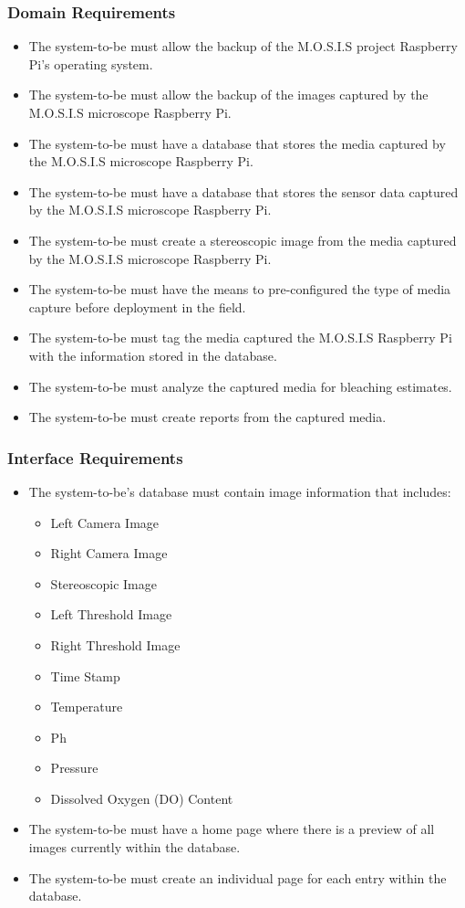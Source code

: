 \documentclass[12pt]{article}
\begin{document}
\subsubsection{Domain Requirements}
\begin{itemize}
	\item The system-to-be must allow the backup of the M.O.S.I.S project Raspberry Pi's operating system.
	\item The system-to-be must allow the backup of the images captured by the M.O.S.I.S microscope Raspberry Pi.
	\item The system-to-be must have a database that stores the media captured by the M.O.S.I.S microscope Raspberry Pi.
	\item The system-to-be must have a database that stores the sensor data captured by the M.O.S.I.S microscope Raspberry Pi.
	\item The system-to-be must create a stereoscopic image from the media captured by the M.O.S.I.S microscope Raspberry Pi.
	\item The system-to-be must have the means to pre-configured the type of media capture before deployment in the field.
	\item The system-to-be must tag the media captured the M.O.S.I.S Raspberry Pi with the information stored in the database.
	\item The system-to-be must analyze the captured media for bleaching estimates.
	\item The system-to-be must create reports from the captured media.
\end{itemize}
\subsubsection{Interface Requirements}
\begin{itemize}
	\item The system-to-be's database must contain image information that includes:
	      \begin{itemize}
		      \item Left Camera Image
		      \item Right Camera Image
		      \item Stereoscopic Image
		      \item Left Threshold Image
		      \item Right Threshold Image
		      \item Time Stamp
		      \item Temperature
		      \item Ph
		      \item Pressure
		      \item Dissolved Oxygen (DO) Content
	      \end{itemize}
	\item The system-to-be must have a home page where there is a preview of all images currently within the database.
	\item The system-to-be must create an individual page for each entry within the database.
\end{itemize}
\end{document}
